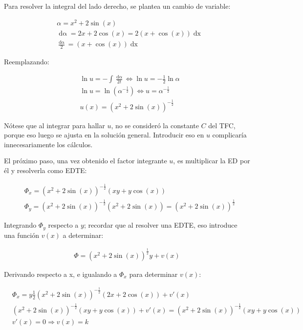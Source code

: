 \documentclass{article}
\begin{document}
Para resolver la integral del lado derecho, se plantea un cambio de variable:

\begin{align}
& \alpha = x^2 + 2 \sin(x) \\
& \mathop{d\alpha} = 2 x + 2 \cos(x) = 2 (x + \cos(x)) \mathop{dx} \\
& \frac{\mathop{d\alpha}}{2} = (x + \cos(x)) \mathop{dx}
\end{align}

Reemplazando:

\begin{align}
& \ln u = -\int \frac{\mathop{d\alpha}}{2 t} \Leftrightarrow \ln u = -\frac{1}{2} \ln \alpha \\
& \ln u = \ln (\alpha^{-\frac{1}{2}}) \Leftrightarrow u = \alpha^{-\frac{1}{2}} \\
& u(x) = (x^2 + 2 \sin(x))^{-\frac{1}{2}}
\end{align}

Nótese que al integrar para hallar $u$, no se consideró la constante $C$ del TFC, porque eso luego se ajusta en la solución general. Introducir eso en $u$ complicaría innecesariamente los cálculos.

El próximo paso, una vez obtenido el factor integrante $u$, es multiplicar la ED por él y resolverla como EDTE:

\begin{align}
& \Phi_x = (x^2 + 2 \sin(x))^{-\frac{1}{2}} (x y + y \cos(x) ) \\
& \Phi_y = (x^2 + 2 \sin(x))^{-\frac{1}{2}} (x^2 + 2 \sin(x)) = (x^2 + 2 \sin(x))^{\frac{1}{2}}
\end{align}

Integrando $\Phi_y$ respecto a $y$; recordar que al resolver una EDTE, eso introduce una función $v(x)$ a determinar:

\begin{align}
\Phi = (x^2 + 2 \sin(x))^{\frac{1}{2}} y + v(x)
\end{align}

Derivando respecto a x, e igualando a $\Phi_x$ para determinar $v(x)$:

\begin{align}
& \Phi_x = y \frac{1}{2} (x^2 + 2 \sin(x))^{-\frac{1}{2}} (2 x + 2 \cos(x)) + v'(x) \\
& (x^2 + 2 \sin(x))^{-\frac{1}{2}} (x y + y \cos(x)) + v'(x) = (x^2 + 2 \sin(x))^{-\frac{1}{2}} (x y + y \cos(x)) \\
& v'(x) = 0 \Rightarrow v(x) = k
\end{align}
\end{document}
